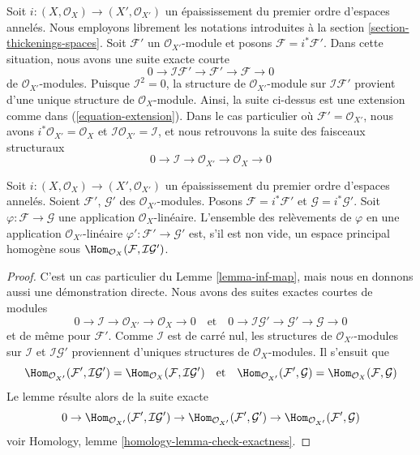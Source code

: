 \noindent
Soit $i : (X, \mathcal{O}_X) \to (X', \mathcal{O}_{X'})$ un épaississement
du premier ordre d'espaces annelés. Nous employons librement les notations introduites à la
section \ref{section-thickenings-spaces}.
Soit $\mathcal{F}'$ un $\mathcal{O}_{X'}$-module
et posons $\mathcal{F} = i^*\mathcal{F}'$.
Dans cette situation, nous avons une suite exacte courte
$$
0 \to \mathcal{I}\mathcal{F}' \to \mathcal{F}' \to \mathcal{F} \to 0
$$
de $\mathcal{O}_{X'}$-modules. Puisque $\mathcal{I}^2 = 0$, la structure de
$\mathcal{O}_{X'}$-module sur $\mathcal{I}\mathcal{F}'$
provient d'une unique structure de $\mathcal{O}_X$-module.
Ainsi, la suite ci-dessus est une extension comme dans (\ref{equation-extension}).
Dans le cas particulier où $\mathcal{F}' = \mathcal{O}_{X'}$, nous avons
$i^*\mathcal{O}_{X'} = \mathcal{O}_X$ et
$\mathcal{I}\mathcal{O}_{X'} = \mathcal{I}$, et nous retrouvons la
suite des faisceaux structuraux
$$
0 \to \mathcal{I} \to \mathcal{O}_{X'} \to \mathcal{O}_X \to 0
$$

\begin{lemma}
\label{lemma-inf-map-special}
Soit $i : (X, \mathcal{O}_X) \to (X', \mathcal{O}_{X'})$
un épaississement du premier ordre d'espaces annelés.
Soient $\mathcal{F}'$, $\mathcal{G}'$ des $\mathcal{O}_{X'}$-modules.
Posons $\mathcal{F} = i^*\mathcal{F}'$ et $\mathcal{G} = i^*\mathcal{G}'$.
Soit $\varphi : \mathcal{F} \to \mathcal{G}$ une application
$\mathcal{O}_X$-linéaire.
L'ensemble des relèvements de $\varphi$ en une application
$\mathcal{O}_{X'}$-linéaire
$\varphi' : \mathcal{F}' \to \mathcal{G}'$ est, s'il est non vide, un espace
principal homogène sous
$\Hom_{\mathcal{O}_X}(\mathcal{F}, \mathcal{I}\mathcal{G}')$.
\end{lemma}

\begin{proof}
C'est un cas particulier du Lemme \ref{lemma-inf-map}, mais nous en donnons
aussi une démonstration directe. Nous avons des suites exactes courtes de modules
$$
0 \to \mathcal{I} \to \mathcal{O}_{X'} \to \mathcal{O}_X \to 0
\quad\text{et}\quad
0 \to \mathcal{I}\mathcal{G}' \to \mathcal{G}' \to \mathcal{G} \to 0
$$
et de même pour $\mathcal{F}'$.
Comme $\mathcal{I}$ est de carré nul, les structures de
$\mathcal{O}_{X'}$-modules sur $\mathcal{I}$ et
$\mathcal{I}\mathcal{G}'$ proviennent d'uniques structures de
$\mathcal{O}_X$-modules. Il s'ensuit que
$$
\Hom_{\mathcal{O}_{X'}}(\mathcal{F}', \mathcal{I}\mathcal{G}') =
\Hom_{\mathcal{O}_X}(\mathcal{F}, \mathcal{I}\mathcal{G}')
\quad\text{et}\quad
\Hom_{\mathcal{O}_{X'}}(\mathcal{F}', \mathcal{G}) =
\Hom_{\mathcal{O}_X}(\mathcal{F}, \mathcal{G})
$$
Le lemme résulte alors de la suite exacte
$$
0 \to \Hom_{\mathcal{O}_{X'}}(\mathcal{F}', \mathcal{I}\mathcal{G}') \to
\Hom_{\mathcal{O}_{X'}}(\mathcal{F}', \mathcal{G}') \to
\Hom_{\mathcal{O}_{X'}}(\mathcal{F}', \mathcal{G})
$$
voir Homology, lemme \ref{homology-lemma-check-exactness}.
\end{proof}


